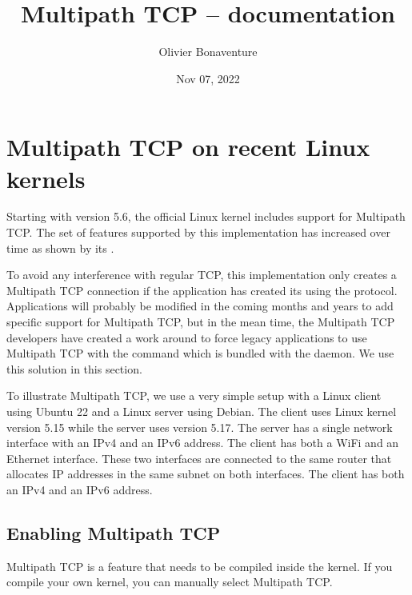 \documentclass[letterpaper,10pt,english]{sphinxmanual}
\title{Multipath TCP -- documentation}
\date{Nov 07, 2022}
\author{Olivier Bonaventure}
\begin{document}
\pagestyle{empty}
\sphinxmaketitle
\pagestyle{plain}
\sphinxtableofcontents
\pagestyle{normal}
\label{\detokenize{index::doc}}



\chapter{Multipath TCP on recent Linux kernels}
\label{\detokenize{mptcp-linux:multipath-tcp-on-recent-linux-kernels}}\label{\detokenize{mptcp-linux::doc}}
\sphinxAtStartPar
Starting with version 5.6, the official Linux kernel includes support for Multipath TCP. The set of features supported by this implementation has increased over time as shown by its .

\sphinxAtStartPar
To avoid any interference with regular TCP, this implementation only creates a Multipath TCP connection if the application has created its  using the  protocol. Applications will probably be modified in the coming months and years to add specific support for Multipath TCP, but in the mean time, the Multipath TCP developers have created a work around to force legacy applications to use Multipath TCP with the  command which is bundled with the  daemon. We use this solution in this section.

\sphinxAtStartPar
To illustrate Multipath TCP, we use a very simple setup with a Linux client using Ubuntu 22 and a Linux server using Debian. The client uses Linux kernel version 5.15 while the server uses version 5.17. The server has a single network interface with an IPv4 and an IPv6 address. The client has both a Wi\sphinxhyphen{}Fi and an Ethernet interface. These two interfaces are connected to the same router that allocates IP addresses in the same subnet on both interfaces. The client has both an IPv4 and an IPv6 address.


\section{Enabling Multipath TCP}
\label{\detokenize{mptcp-linux:enabling-multipath-tcp}}
\sphinxAtStartPar
Multipath TCP is a feature that needs to be compiled inside the kernel. If you compile your own kernel, you can manually select Multipath TCP.
\end{document}
